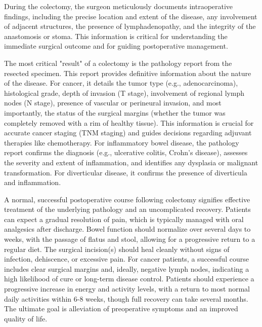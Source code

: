 During the colectomy, the surgeon meticulously documents intraoperative findings, including the precise location and extent of the disease, any involvement of adjacent structures, the presence of lymphadenopathy, and the integrity of the anastomosis or stoma. This information is critical for understanding the immediate surgical outcome and for guiding postoperative management.

The most critical "result" of a colectomy is the pathology report from the resected specimen. This report provides definitive information about the nature of the disease. For cancer, it details the tumor type (e.g., adenocarcinoma), histological grade, depth of invasion (T stage), involvement of regional lymph nodes (N stage), presence of vascular or perineural invasion, and most importantly, the status of the surgical margins (whether the tumor was completely removed with a rim of healthy tissue). This information is crucial for accurate cancer staging (TNM staging) and guides decisions regarding adjuvant therapies like chemotherapy. For inflammatory bowel disease, the pathology report confirms the diagnosis (e.g., ulcerative colitis, Crohn's disease), assesses the severity and extent of inflammation, and identifies any dysplasia or malignant transformation. For diverticular disease, it confirms the presence of diverticula and inflammation.

A normal, successful postoperative course following colectomy signifies effective treatment of the underlying pathology and an uncomplicated recovery. Patients can expect a gradual resolution of pain, which is typically managed with oral analgesics after discharge. Bowel function should normalize over several days to weeks, with the passage of flatus and stool, allowing for a progressive return to a regular diet. The surgical incision(s) should heal cleanly without signs of infection, dehiscence, or excessive pain. For cancer patients, a successful course includes clear surgical margins and, ideally, negative lymph nodes, indicating a high likelihood of cure or long-term disease control. Patients should experience a progressive increase in energy and activity levels, with a return to most normal daily activities within 6-8 weeks, though full recovery can take several months. The ultimate goal is alleviation of preoperative symptoms and an improved quality of life.

